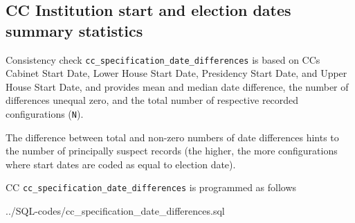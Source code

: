 \subsection{CC Institution start and election dates summary statistics}\label{cc_specification_date_differencese}
Consistency check \texttt{\footnotesize cc\_specification\_date\_differences} is based on CCs Cabinet Start Date, Lower House Start Date, Presidency Start Date, and Upper House Start Date, and provides
mean and median date difference, the number of differences unequal zero, and the total number of respective recorded configurations (\texttt{\footnotesize N}).

The difference between total and non-zero numbers of date differences hints to the number of principally suspect records (the higher, the more configurations where start dates are coded as equal to election date).

CC \texttt{\footnotesize cc\_specification\_date\_differences} is programmed as follows

%
{../SQL-codes/cc_specification_date_differences.sql}

